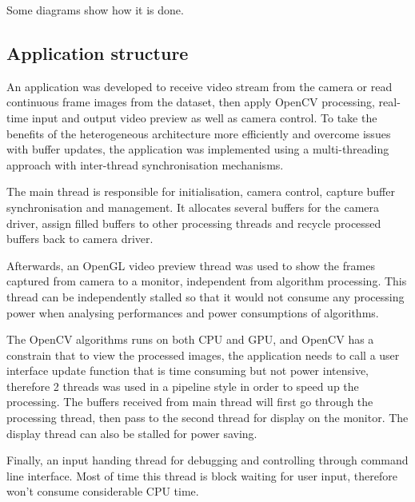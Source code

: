 {\color{red}Some diagrams show how it is done.}

\subsection{Application structure}

An application was developed to receive video stream from the camera or read continuous frame images from the dataset, then apply OpenCV processing, real-time input and output video preview as well as camera control. To take the benefits of the heterogeneous architecture more efficiently and overcome issues with buffer updates, the application was implemented using a multi-threading approach with inter-thread synchronisation mechanisms.

The main thread is responsible for initialisation, camera control, capture buffer synchronisation and management. It allocates several buffers for the camera driver, assign filled buffers to other processing threads and recycle processed buffers back to camera driver.

Afterwards, an OpenGL video preview thread was used to show the frames captured from camera to a monitor, independent from algorithm processing. This thread can be independently stalled so that it would not consume any processing power when analysing performances and power consumptions of algorithms.

The OpenCV algorithms runs on both CPU and GPU, and OpenCV has a constrain that to view the processed images, the application needs to call a user interface update function that is time consuming but not power intensive, therefore 2 threads was used in a pipeline style in order to speed up the processing. The buffers received from main thread will first go through the processing thread, then pass to the second thread for display on the monitor. The display thread can also be stalled for power saving.


Finally, an input handing thread for debugging and controlling through command line interface. Most of time this thread is block waiting for user input, therefore won't consume considerable CPU time.

